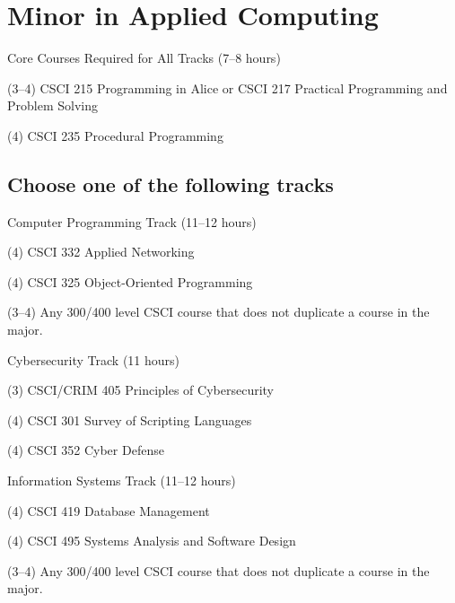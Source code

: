 %
\section*{Minor in Applied Computing}

\begin{reqgroup}{Core Courses Required for All Tracks (7--8 hours)}
\begin{checklist}
\begin{minipage}[t]{0.5\linewidth}
	\item (3--4) CSCI 215 Programming in Alice or CSCI 217 Practical Programming and Problem Solving
	\item (4) CSCI 235	Procedural Programming
\end{minipage}
\begin{minipage}[t]{0.5\linewidth}
\end{minipage}
\end{checklist}
\end{reqgroup}

\vspace{1em}
\subsection*{Choose one of the following tracks}

\begin{reqgroup}{Computer Programming Track (11--12 hours)}
\begin{checklist}
	\item (4) CSCI 332 Applied Networking
	\item (4) CSCI 325 Object-Oriented Programming
	\item (3--4) Any 300/400 level CSCI course that does not duplicate a course in the major.
\end{checklist}
\end{reqgroup}

\begin{reqgroup}{Cybersecurity Track (11 hours)}
\begin{checklist}
	\item (3) CSCI/CRIM 405 Principles of Cybersecurity
	\item (4) CSCI 301 Survey of Scripting Languages
	\item (4) CSCI 352 Cyber Defense
\end{checklist}
\end{reqgroup}

\begin{reqgroup}{Information Systems Track (11--12 hours)}
\begin{checklist}
	\item (4) CSCI 419 Database Management
	\item (4) CSCI 495 Systems Analysis and Software Design
	\item (3--4) Any 300/400 level CSCI course that does not duplicate a course in the major.
\end{checklist}
\end{reqgroup}

